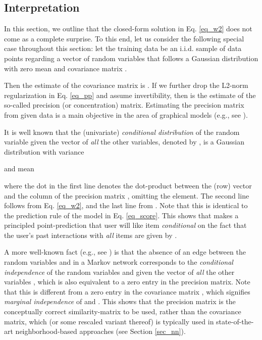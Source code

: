 \documentclass[sigconf]{acmart}
\newcommand{\sae}{}
\begin{document}
\subsection{Interpretation}
\label{sec_interpretation}
In this section, we outline that the closed-form solution in Eq. \ref{eq_w2} does not come as  a complete surprise. To this end, let us consider the following special case throughout this section: let  the training data  be an i.i.d. sample of  data points regarding a vector of  random variables  that follows a Gaussian distribution with zero mean and covariance matrix .

Then  the  estimate of the covariance matrix is . If we further drop the L2-norm regularization in Eq. \ref{eq_pp} and assume  invertibility, then   is the estimate of the so-called precision (or concentration) matrix. 
 Estimating the precision matrix from given data is a  main objective in  the area of graphical models (e.g., see \cite{lauritzenbuch96}).

It is well known \cite{lauritzenbuch96,besag75} that the (univariate) \emph{conditional distribution} of the random variable  given the vector of \emph{all} the other variables, denoted by  , is  a Gaussian distribution with variance 
   
and mean 

where the dot in the first line denotes the dot-product between the (row) vector  and the  column of the precision matrix , omitting the   element.  The second line follows from Eq. \ref{eq_w2}, and the last line from  .
Note that this is identical to the prediction rule of the \sae{}  model  in Eq. \ref{eq_score}. This shows that \sae{}  makes a principled point-prediction that  user  will like item  \emph{conditional} on the fact that the user's past interactions with \emph{all}   items are given by .


A more well-known fact   (e.g., see \cite{meinshausen06}) is that the absence of an edge between the random variables  and  in a Markov network corresponds to the \emph{conditional independence} of the random variables  and  given the vector of \emph{all} the other variables , which is also equivalent to a zero entry in the precision matrix. Note that this is different from a zero entry in the covariance matrix , which signifies  \emph{marginal independence} of  and . This shows that the precision matrix is the conceptually correct similarity-matrix to be used, rather than the covariance matrix, which (or some rescaled variant thereof) is typically used in state-of-the-art  neighborhood-based approaches (see Section \ref{sec_nn}).
\end{document}
